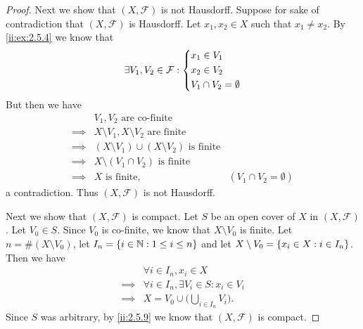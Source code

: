 \begin{proof}
  Next we show that \((X, \mathcal{F})\) is not Hausdorff.
  Suppose for sake of contradiction that \((X, \mathcal{F})\) is Hausdorff.
  Let \(x_1, x_2 \in X\) such that \(x_1 \neq x_2\).
  By \cref{ii:ex:2.5.4} we know that
  \[
    \exists V_1, V_2 \in \mathcal{F} : \begin{dcases}
      x_1 \in V_1 \\
      x_2 \in V_2 \\
      V_1 \cap V_2 = \emptyset
    \end{dcases}
  \]
  But then we have
  \begin{align*}
             & V_1, V_2 \text{ are co-finite}                                                          \\
    \implies & X \setminus V_1, X \setminus V_2 \text{ are finite}                                     \\
    \implies & (X \setminus V_1) \cup (X \setminus V_2) \text{ is finite}                              \\
    \implies & X \setminus (V_1 \cap V_2) \text{ is finite}                                            \\
    \implies & X \text{ is finite},                                       & (V_1 \cap V_2 = \emptyset)
  \end{align*}
  a contradiction.
  Thus \((X, \mathcal{F})\) is not Hausdorff.

  Next we show that \((X, \mathcal{F})\) is compact.
  Let \(S\) be an open cover of \(X\) in \((X, \mathcal{F})\).
  Let \(V_0 \in S\).
  Since \(V_0\) is co-finite, we know that \(X \setminus V_0\) is finite.
  Let \(n = \#(X \setminus V_0)\), let \(I_n = \left\lbrace i \in \mathbb{N} : 1 \leq i \leq n\right\rbrace\) and let \(X \setminus V_0 = \left\lbrace x_i \in X : i \in I_n\right\rbrace\).
  Then we have
  \begin{align*}
             & \forall i \in I_n, x_i \in X                       \\
    \implies & \forall i \in I_n, \exists V_i \in S : x_i \in V_i \\
    \implies & X = V_0 \cup \bigg(\bigcup_{i \in I_n} V_i\bigg).
  \end{align*}
  Since \(S\) was arbitrary, by \cref{ii:2.5.9} we know that \((X, \mathcal{F})\) is compact.


\end{proof}
